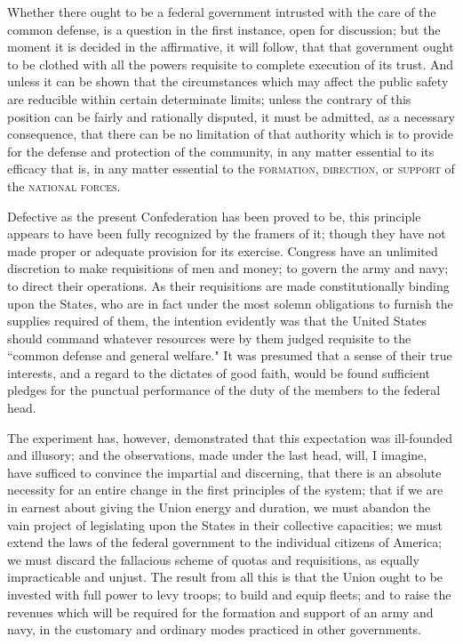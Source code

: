 Whether there ought to be a federal government intrusted with the care of the common defense, is a question in the first instance, open for discussion; but the moment it is decided in the affirmative, it will follow, that that government ought to be clothed with all the powers requisite to complete execution of its trust. And unless it can be shown that the circumstances which may affect the public safety are reducible within certain determinate limits; unless the contrary of this position can be fairly and rationally disputed, it must be admitted, as a necessary consequence, that there can be no limitation of that authority which is to provide for the defense and protection of the community, in any matter essential to its efficacy that is, in any matter essential to the \textsc{formation}, \textsc{direction}, or \textsc{support }of the \textsc{national forces}.

Defective as the present Confederation has been proved to be, this principle appears to have been fully recognized by the framers of it; though they have not made proper or adequate provision for its exercise. Congress have an unlimited discretion to make requisitions of men and money; to govern the army and navy; to direct their operations. As their requisitions are made constitutionally binding upon the States, who are in fact under the most solemn obligations to furnish the supplies required of them, the intention evidently was that the United States should command whatever resources were by them judged requisite to the ``common defense and general welfare." It was presumed that a sense of their true interests, and a regard to the dictates of good faith, would be found sufficient pledges for the punctual performance of the duty of the members to the federal head.

The experiment has, however, demonstrated that this expectation was ill-founded and illusory; and the observations, made under the last head, will, I imagine, have sufficed to convince the impartial and discerning, that there is an absolute necessity for an entire change in the first principles of the system; that if we are in earnest about giving the Union energy and duration, we must abandon the vain project of legislating upon the States in their collective capacities; we must extend the laws of the federal government to the individual citizens of America; we must discard the fallacious scheme of quotas and requisitions, as equally impracticable and unjust. The result from all this is that the Union ought to be invested with full power to levy troops; to build and equip fleets; and to raise the revenues which will be required for the formation and support of an army and navy, in the customary and ordinary modes practiced in other governments.

